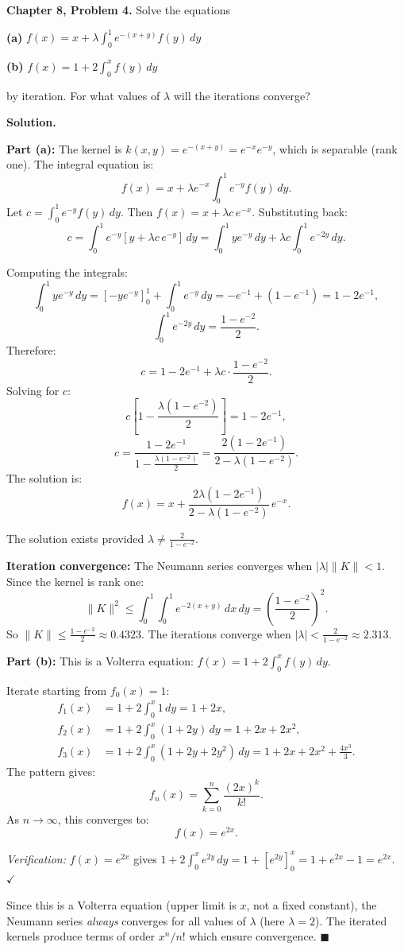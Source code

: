 \documentclass[12pt]{article}
\begin{document}
\textbf{Chapter 8, Problem 4.} Solve the equations

\textbf{(a)} $f(x) = x + \lambda\int_0^1 e^{-(x+y)}f(y)\,dy$

\textbf{(b)} $f(x) = 1 + 2\int_0^x f(y)\,dy$

by iteration. For what values of $\lambda$ will the iterations converge?

\bigskip
\textbf{Solution.}

\textbf{Part (a):}
The kernel is $k(x,y) = e^{-(x+y)} = e^{-x}e^{-y}$, which is separable (rank one). The integral equation is:
\[
f(x) = x + \lambda e^{-x}\int_0^1 e^{-y}f(y)\,dy.
\]
Let $c = \int_0^1 e^{-y}f(y)\,dy$. Then $f(x) = x + \lambda c\, e^{-x}$. Substituting back:
\[
c = \int_0^1 e^{-y}[y + \lambda c\, e^{-y}]\,dy = \int_0^1 y e^{-y}\,dy + \lambda c\int_0^1 e^{-2y}\,dy.
\]

Computing the integrals:
\[
\int_0^1 ye^{-y}\,dy = [-ye^{-y}]_0^1 + \int_0^1 e^{-y}\,dy = -e^{-1} + (1-e^{-1}) = 1-2e^{-1},
\]
\[
\int_0^1 e^{-2y}\,dy = \frac{1-e^{-2}}{2}.
\]
Therefore:
\[
c = 1-2e^{-1} + \lambda c\cdot\frac{1-e^{-2}}{2}.
\]
Solving for $c$:
\[
c\left[1-\frac{\lambda(1-e^{-2})}{2}\right] = 1-2e^{-1},
\]
\[
c = \frac{1-2e^{-1}}{1-\frac{\lambda(1-e^{-2})}{2}} = \frac{2(1-2e^{-1})}{2-\lambda(1-e^{-2})}.
\]
The solution is:
\[
\boxed{f(x) = x + \frac{2\lambda(1-2e^{-1})}{2-\lambda(1-e^{-2})}\,e^{-x}.}
\]

The solution exists provided $\lambda \ne \frac{2}{1-e^{-2}}$.

\textbf{Iteration convergence:} The Neumann series converges when $|\lambda|\|K\| < 1$. Since the kernel is rank one:
\[
\|K\|^2 \le \int_0^1\int_0^1 e^{-2(x+y)}\,dx\,dy = \left(\frac{1-e^{-2}}{2}\right)^2.
\]
So $\|K\| \le \frac{1-e^{-2}}{2} \approx 0.4323$. The iterations converge when $|\lambda| < \frac{2}{1-e^{-2}} \approx 2.313$.

\bigskip
\textbf{Part (b):}
This is a Volterra equation: $f(x) = 1 + 2\int_0^x f(y)\,dy$.

Iterate starting from $f_0(x) = 1$:
\begin{align*}
f_1(x) &= 1 + 2\int_0^x 1\,dy = 1 + 2x, \\
f_2(x) &= 1 + 2\int_0^x(1+2y)\,dy = 1 + 2x + 2x^2, \\
f_3(x) &= 1 + 2\int_0^x(1+2y+2y^2)\,dy = 1 + 2x + 2x^2 + \frac{4x^3}{3}.
\end{align*}
The pattern gives:
\[
f_n(x) = \sum_{k=0}^{n} \frac{(2x)^k}{k!}.
\]
As $n\to\infty$, this converges to:
\[
\boxed{f(x) = e^{2x}.}
\]

\textit{Verification:} $f(x) = e^{2x}$ gives $1+2\int_0^x e^{2y}\,dy = 1+[e^{2y}]_0^x = 1+e^{2x}-1 = e^{2x}$. $\checkmark$

Since this is a Volterra equation (upper limit is $x$, not a fixed constant), the Neumann series \emph{always} converges for all values of $\lambda$ (here $\lambda=2$). The iterated kernels produce terms of order $x^n/n!$ which ensure convergence. $\blacksquare$
\end{document}
